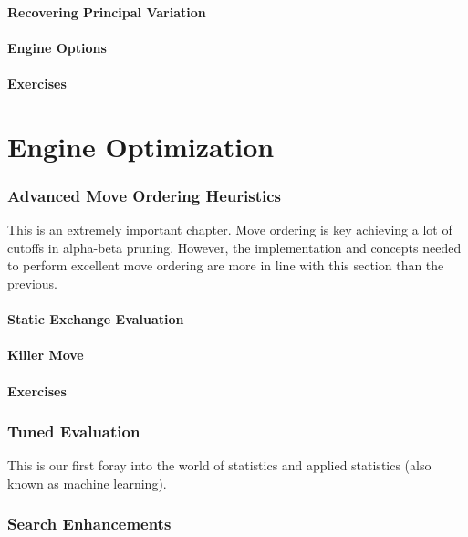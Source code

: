 \documentclass[letterpaper,11pt]{article}
\begin{document}
\subsection{Recovering Principal Variation}

\subsection{Engine Options}

\subsection{Exercises}

\newpage
\part{Engine Optimization}

\section{Advanced Move Ordering Heuristics}

This is an extremely important chapter.
Move ordering is key achieving a lot of cutoffs in alpha-beta pruning. 
However, the implementation and concepts needed to perform
excellent move ordering are more in line with this section than the previous.

\subsection{Static Exchange Evaluation}
\subsection{Killer Move}
\subsection{Exercises}


\section{Tuned Evaluation}

This is our first foray into the world of statistics and applied statistics (also known as machine learning).

\section{Search Enhancements}
\end{document}
